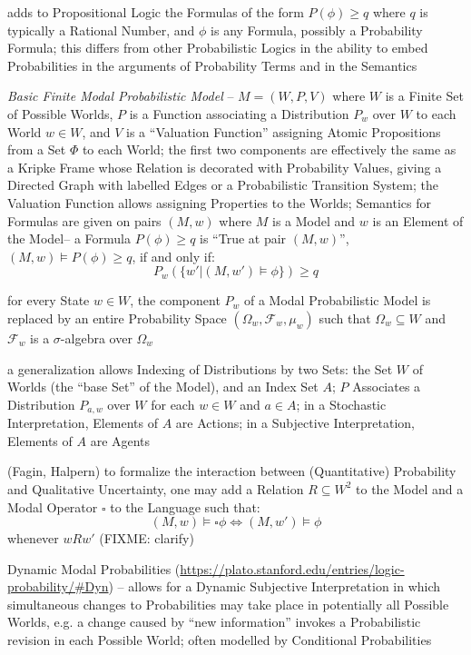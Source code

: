 adds to Propositional Logic the Formulas of the form $P(\phi) \geq q$ where $q$
is typically a Rational Number, and $\phi$ is any Formula, possibly a
Probability Formula; this differs from other Probabilistic Logics in the ability
to embed Probabilities in the arguments of Probability Terms and in the
Semantics

\emph{Basic Finite Modal Probabilistic Model} -- $M = (W, P, V)$ where $W$ is a
Finite Set of Possible Worlds, $P$ is a Function associating a Distribution
$P_w$ over $W$ to each World $w \in W$, and $V$ is a ``Valuation Function''
assigning Atomic Propositions from a Set $\Phi$ to each World; the first two
components are effectively the same as a Kripke Frame whose Relation is
decorated with Probability Values, giving a Directed Graph with labelled Edges
or a Probabilistic Transition System; the Valuation Function allows assigning
Properties to the Worlds; Semantics for Formulas are given on pairs $(M,w)$
where $M$ is a Model and $w$ is an Element of the Model-- a Formula
$P(\phi) \geq q$ is ``True at pair $(M,w)$'', $(M,w) \vDash P(\phi) \geq q$,
if and only if:
\[
  P_w(\{ w' | (M,w') \vDash \phi \}) \geq q
\]

for every State $w \in W$, the component $P_w$ of a Modal Probabilistic Model is
replaced by an entire Probability Space $(\Omega_w, \mathcal{F}_w, \mu_w)$ such
that $\Omega_w \subseteq W$ and $\mathcal{F}_w$ is a $\sigma$-algebra over
$\Omega_w$

a generalization allows Indexing of Distributions by two Sets: the Set $W$ of
Worlds (the ``base Set'' of the Model), and an Index Set $A$; $P$ Associates a
Distribution $P_{a,w}$ over $W$ for each $w \in W$ and $a \in A$; in a
Stochastic Interpretation, Elements of $A$ are Actions; in a Subjective
Interpretation, Elements of $A$ are Agents

(Fagin, Halpern)
to formalize the interaction between (Quantitative) Probability
and Qualitative Uncertainty, one may add a Relation $R \subseteq W^2$ to the
Model and a Modal Operator $\square$ to the Language such that:
\[
  (M,w) \vDash \square\phi \Leftrightarrow (M,w') \vDash \phi
\]
whenever $wRw'$ (FIXME: clarify)

Dynamic Modal Probabilities
(\url{https://plato.stanford.edu/entries/logic-probability/#Dyn}) -- allows for
a Dynamic Subjective Interpretation in which simultaneous changes to
Probabilities may take place in potentially all Possible Worlds, e.g. a change
caused by ``new information'' invokes a Probabilistic revision in each Possible
World; often modelled by Conditional Probabilities



